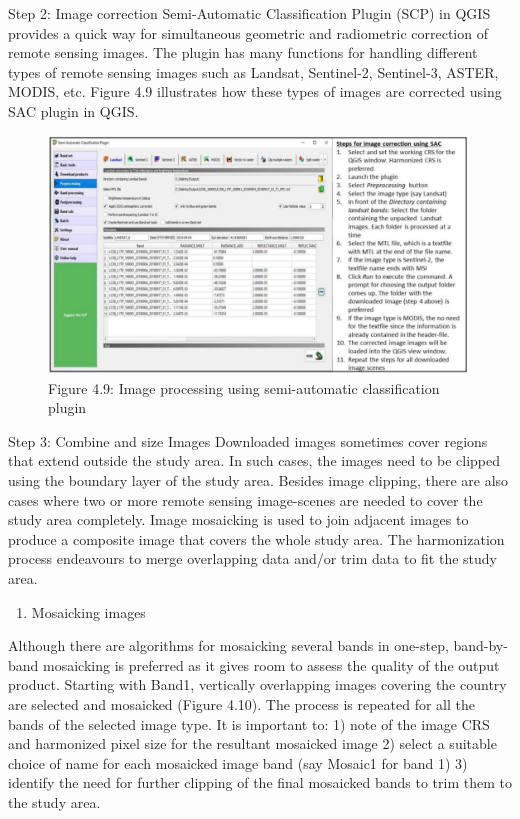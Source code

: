 \documentclass[
  10pt,
  b5paper,
]{book}
\providecommand{\tightlist}{%
  \setlength{\itemsep}{0pt}\setlength{\parskip}{0pt}}
\begin{document}
Step 2: Image correction
Semi-Automatic Classification Plugin (SCP) in QGIS provides a quick way for simultaneous geometric and radiometric correction of remote sensing images. The plugin has many functions for handling different types of remote sensing images such as Landsat, Sentinel-2, Sentinel-3, ASTER, MODIS, etc. Figure 4.9 illustrates how these types of images are corrected using SAC plugin in QGIS.

\begin{figure}
\centering
\includegraphics{figures/images/Figure4.9.PNG}
\caption{Figure 4.9: Image processing using semi-automatic classification plugin}
\end{figure}

Step 3: Combine and size Images
Downloaded images sometimes cover regions that extend outside the study area. In such cases, the images need to be clipped using the boundary layer of the study area. Besides image clipping, there are also cases where two or more remote sensing image-scenes are needed to cover the study area completely. Image mosaicking is used to join adjacent images to produce a composite image that covers the whole study area. The harmonization process endeavours to merge overlapping data and/or trim data to fit the study area.

\begin{enumerate}
\def\labelenumi{(\arabic{enumi})}
\setcounter{enumi}{1}
\tightlist
\item
  Mosaicking images
\end{enumerate}

Although there are algorithms for mosaicking several bands in one-step, band-by-band mosaicking is preferred as it gives room to assess the quality of the output product. Starting with Band1, vertically overlapping images covering the country are selected and mosaicked (Figure 4.10). The process is repeated for all the bands of the selected image type. It is important to:
1) note of the image CRS and harmonized pixel size for the resultant mosaicked image
2) select a suitable choice of name for each mosaicked image band (say Mosaic1 for band 1)
3) identify the need for further clipping of the final mosaicked bands to trim them to the study area.
\end{document}
